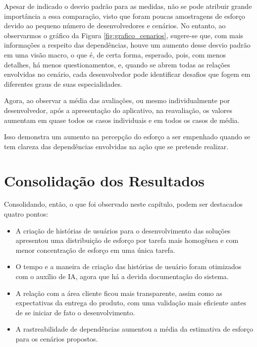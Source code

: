 	Apesar de indicado o desvio padrão para as medidas, não se pode atribuir grande importância a essa comparação, visto que foram poucas amostragens de esforço devido ao pequeno número de desenvolvedores e cenários.
	No entanto, ao observarmos o gráfico da Figura \ref{fig:grafico_cenarios}, sugere-se que, com mais informações a respeito das dependências, houve um aumento desse desvio padrão em uma visão macro, o que é, de certa forma, esperado,
	pois, com menos detalhes, há menos questionamentos, e, quando se abrem todas as relações envolvidas no cenário, cada desenvolvedor pode identificar desafios que fogem em diferentes graus de suas especialidades.

	Agora, ao observar a média das avaliações, ou mesmo individualmente por
	desenvolvedor, após a apresentação do aplicativo, na reavaliação, os valores aumentam em quase todos os casos individuais e em todos os casos de média.

	Isso demonstra um aumento na percepção do esforço a ser empenhado quando se tem clareza das dependências envolvidas na ação que se pretende realizar.

	\section{Consolidação dos Resultados}

	Consolidando, então, o que foi observado neste capítulo, podem ser destacados quatro pontos:

	\begin{itemize}
		\item A criação de histórias de usuários para o desenvolvimento das soluções apresentou uma distribuição de esforço por tarefa mais homogênea e com menor concentração de esforço em uma única tarefa.
		\item O tempo e a maneira de criação das histórias de usuário foram otimizados com o auxílio de IA, agora que há a devida documentação do sistema.
		\item A relação com a área cliente ficou mais transparente, assim como as expectativas da entrega do produto, com uma validação mais eficiente antes de se iniciar de fato o desenvolvimento.
		\item A rastreabilidade de dependências aumentou a média da estimativa de esforço para os cenários propostos.
	\end{itemize}
